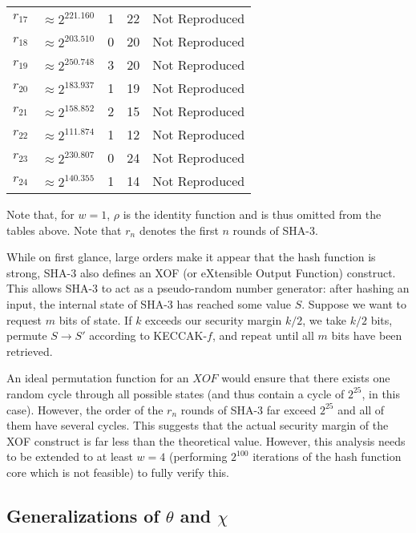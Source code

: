 \documentclass[10pt,twocolumn,twoside]{pnas-new}
\begin{document}
\begin{tabular}{c c c c c}
    $r_{17}$ & $\approx 2^{221.160}$ & 1 & 22 & Not Reproduced \\
    $r_{18}$ & $\approx 2^{203.510}$ & 0 & 20 & Not Reproduced \\
    $r_{19}$ & $\approx 2^{250.748}$ & 3 & 20 & Not Reproduced \\
    $r_{20}$ & $\approx 2^{183.937}$ & 1 & 19 & Not Reproduced \\
    $r_{21}$ & $\approx 2^{158.852}$ & 2 & 15 & Not Reproduced \\
    $r_{22}$ & $\approx 2^{111.874}$ & 1 & 12 & Not Reproduced \\
    $r_{23}$ & $\approx 2^{230.807}$ & 0 & 24 & Not Reproduced \\
    $r_{24}$ & $\approx 2^{140.355}$ & 1 & 14 & Not Reproduced
\end{tabular}

Note that, for $w=1$, $\rho$ is the identity function and is thus omitted from
the tables above. Note that $r_{n}$ denotes the first $n$ rounds of SHA-3.

While on first glance, large orders make it appear that the hash function is
strong, SHA-3 also defines an XOF (or eXtensible Output Function) construct.
This allows SHA-3 to act as a pseudo-random number generator: after hashing
an input, the internal state of SHA-3 has reached some value $S$. Suppose we
want to request $m$ bits of state. If $k$ exceeds our security margin $k/2$,
we take $k/2$ bits, permute $S \rightarrow S'$ according to KECCAK-$f$,
and repeat until all $m$ bits have been retrieved.

An ideal permutation function for an $XOF$ would ensure that there exists one
random cycle through all possible states (and thus contain a cycle of $2^{25}$,
in this case). However, the order of the $r_{n}$ rounds of SHA-3 far exceed
$2^{25}$ and all of them have several cycles. This suggests that the actual
security margin of the XOF construct is far less than the theoretical value.
However, this analysis needs to be extended to at least $w=4$ (performing
$2^{100}$ iterations of the hash function core which is not feasible) to
fully verify this.



\subsection{Generalizations of $\theta$ and $\chi$} \label{sec:p:generalizations}
\end{document}

